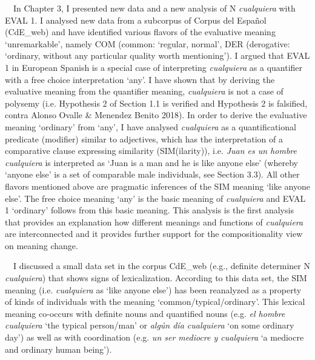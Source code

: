 \begin{styleStandard}
\ \ In Chapter 3, I presented new data and a new analysis of N \textit{cualquiera} with EVAL 1. I analysed new data from a subcorpus of Corpus del Español (CdE\_web) and have identified various flavors of the evaluative meaning ‘unremarkable’, namely COM (common: ‘regular, normal’, DER (derogative: ‘ordinary, without any particular quality worth mentioning’). I argued that EVAL 1 in European Spanish is a special case of interpreting \textit{cualquiera} as a quantifier with a free choice interpretation ‘any’. I have shown that by deriving the evaluative meaning from the quantifier meaning, \textit{cualquiera} is not a case of polysemy (i.e. Hypothesis 2 of Section 1.1 is verified and Hypothesis 2 is falsified, contra Alonso Ovalle \& Menendez Benito 2018). In order to derive the evaluative meaning ‘ordinary’ from ‘any’, I have analysed \textit{cualquiera} as a quantificational predicate (modifier) similar to adjectives, which has the interpretation of a comparative clause expressing similarity (SIM(ilarity)), i.e. \textit{Juan es un hombre cualquiera} is interpreted as ‘Juan is a man and he is like anyone else’ (whereby ‘anyone else’ is a set of comparable male individuals, see Section 3.3). All other flavors mentioned above are pragmatic inferences of the SIM meaning ‘like anyone else’. The free choice meaning ‘any’ is the basic meaning of \textit{cualquiera} and EVAL 1 ‘ordinary’ follows from this basic meaning. This analysis is the first analysis that provides an explanation how different meanings and functions of \textit{cualquiera} are interconnected and it provides further support for the compositionality view on meaning change.
\end{styleStandard}

\begin{styleStandard}
\ \ I discussed a small data set in the corpus CdE\_web (e.g., definite determiner N \textit{cualquiera}) that shows signs of lexicalization. According to this data set, the SIM meaning (i.e. \textit{cualquiera} as ‘like anyone else’) has been reanalyzed as a property of kinds of individuals with the meaning ‘common/typical/ordinary’. This lexical meaning co-occurs with definite nouns and quantified nouns (e.g. \textit{el hombre cualquiera} ‘the typical person/man’ or \textit{algún día cualquiera} ‘on some ordinary day’) as well as with coordination (e.g. \textit{un ser mediocre y cualquiera} ‘a mediocre and ordinary human being’).
\end{styleStandard}

